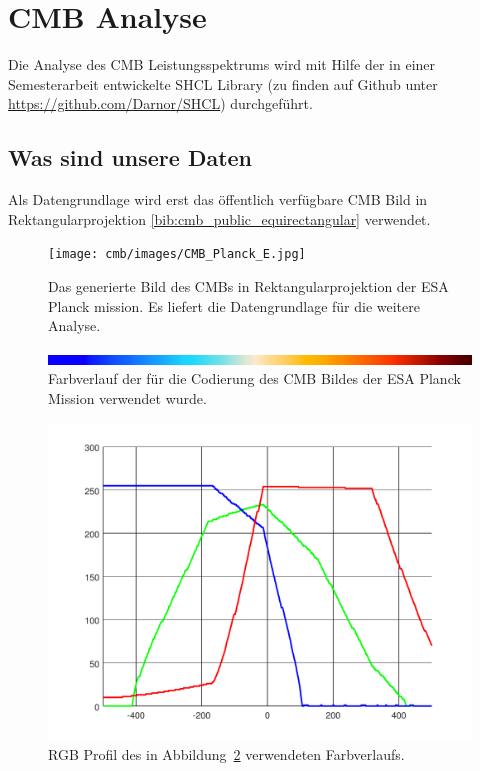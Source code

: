 \section{CMB Analyse}

Die Analyse des CMB Leistungsspektrums wird mit Hilfe der in einer 
Semesterarbeit entwickelte SHCL Library (zu finden auf Github unter 
\url{https://github.com/Darnor/SHCL}) durchgeführt.

\subsection{Was sind unsere Daten}
Als Datengrundlage wird erst das öffentlich verfügbare CMB Bild in 
Rektangularprojektion \ref{bib:cmb_public_equirectangular} verwendet.

\begin{figure}
	\centering
	\texttt{[image: cmb/images/CMB\_Planck\_E.jpg]}
	\caption{Das generierte Bild des CMBs in Rektangularprojektion der ESA 
	Planck mission. Es liefert die Datengrundlage für die weitere Analyse.}
	\label{fig:cmb-rectangular}
\end{figure}

\begin{figure}
	\centering
	\includegraphics[width=\linewidth]{cmb/images/color-strip-full.png}
	\caption{Farbverlauf der für die Codierung des CMB Bildes der ESA Planck 
		Mission verwendet wurde.}
	\label{fig:color-strip-orig}
\end{figure}

\begin{figure}
	\centering
	\includegraphics[width=\linewidth]{cmb/converter/rgb-graph.pdf}
	\caption{RGB Profil des in Abbildung~\ref{fig:color-strip-orig} 
		verwendeten Farbverlaufs.}
	\label{fig:color-strip-orig-rgb}
\end{figure}

